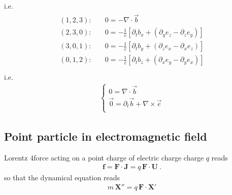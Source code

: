 \documentclass[letterpaper,10pt,english]{jupyterBook}
\begin{document}
\begin{itemize}
\begin{equation*}
\begin{split}
\begin{aligned}
  \end{aligned}\end{split}
\end{equation*}
\sphinxAtStartPar
i.e.
\begin{equation*}
\begin{split}\begin{aligned}
    (1,2,3): & \quad 0 = - \nabla \cdot \vec{b} \\
    (2,3,0): & \quad 0 = -\frac{1}{c} \left[ \partial_t b_x + (\partial_y e_z - \partial_z e_y ) \right] \\ 
    (3,0,1): & \quad 0 = -\frac{1}{c} \left[ \partial_t b_y + (\partial_z e_x - \partial_x e_z ) \right] \\
    (0,1,2): & \quad 0 = -\frac{1}{c} \left[ \partial_t b_z + (\partial_x e_y - \partial_y e_x ) \right] \\
  \end{aligned}\end{split}
\end{equation*}
\sphinxAtStartPar
i.e.
\begin{equation*}
\begin{split}\begin{cases}
        0  = \nabla \cdot \vec{b} \\
   \vec{0} = \partial_t \vec{b} + \nabla \times \vec{e} \\
  \end{cases}\end{split}
\end{equation*}
\end{itemize}


\subsection{Point particle in electromagnetic field}
\label{\detokenize{ch/relativity-special/notes:point-particle-in-electromagnetic-field}}
\sphinxAtStartPar
Lorentz 4\sphinxhyphen{}force acting on a point charge of electric charge charge \(q\) reads
\begin{equation*}
\begin{split}\mathbf{f} = \mathbf{F} \cdot \mathbf{J} = q \, \mathbf{F} \cdot \mathbf{U} \ .\end{split}
\end{equation*}
\sphinxAtStartPar
so that the dynamical equation reads
\begin{equation*}
\begin{split}m \, \mathbf{X}'' = q \, \mathbf{F} \cdot \mathbf{X}'\end{split}
\end{equation*}
\end{document}
